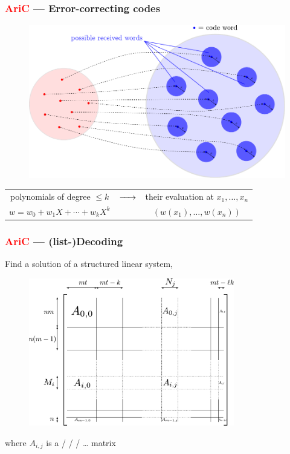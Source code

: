 \documentclass[c]{beamer}
\begin{document}
\begin{frame}
	\frametitle{\textcolor{red}{AriC} --- Error-correcting codes}

	\begin{figure}
		\centering
		\includegraphics[width=\textwidth]{JDD2014/figures/encoding_schema_balls_radius_e.pdf}
	\end{figure}

	\hspace{-1.1cm}
	\begin{tabular}{ccc}
		polynomials of degree $\leqslant k$ & $\xrightarrow{\hspace*{0.5cm}}$ & their evaluation at $x_1,\ldots,x_n$ \\
		$w = w_0 + w_1 X + \cdots + w_k X^k$ & & $(w(x_1),\ldots,w(x_n))$
	\end{tabular}
\end{frame}


\begin{frame}
	\frametitle{\textcolor{red}{AriC} --- (list-)Decoding}

	Find a \alert{solution} of a \alert{structured linear system},
	\begin{figure}
		\centering
		\includegraphics[width=0.8\textwidth]{JDD2014/figures/block_hankel_system.pdf}
	\end{figure}
	where $A_{i,j}$ is a  /  
	/  / \ldots{} matrix
\end{frame}
\end{document}
